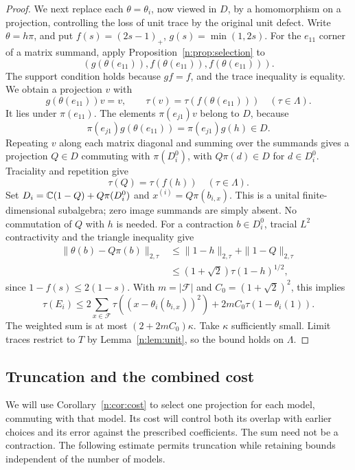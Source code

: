 \begin{proof}
We next replace each $\theta=\theta_i$, now viewed in $D$, by a
homomorphism on a projection, controlling the loss of unit trace by
the original unit defect. Write $\theta=h\pi$, and put
$f(s)=(2s-1)_+$, $g(s)=\min(1,2s)$. For the $e_{11}$ corner of a matrix
summand, apply Proposition~\ref{n:prop:selection} to
\[
 (g(\theta(e_{11})),f(\theta(e_{11})),f(\theta(e_{11}))).
\]
The support condition holds because $gf=f$, and the trace inequality
is equality. We obtain a projection $v$ with
\[
 g(\theta(e_{11}))v=v,\qquad
 \tau(v)=\tau(f(\theta(e_{11})))\quad(\tau\in \Lambda).
\]
It lies under $\pi(e_{11})$. The elements $\pi(e_{j1})v$ belong to $D$,
because
\[
 \pi(e_{j1})g(\theta(e_{11}))=\pi(e_{j1})g(h)\in D.
\]
Repeating $v$ along each matrix diagonal and summing over the summands
gives a projection $Q\in D$ commuting with $\pi(D_i^0)$, with
$Q\pi(d)\in D$ for $d\in D_i^0$. Traciality and repetition give
\[
 \tau(Q)=\tau(f(h))\quad(\tau\in \Lambda).
\]
Set $D_i=\mathbb C(1-Q)+Q\pi(D_i^0)$ and $x^{(i)}=Q\pi(b_{i,x})$.
This is a unital finite-dimensional subalgebra; zero image summands are
simply absent. No commutation of $Q$ with $h$ is needed. For a contraction
$b\in D_i^0$, tracial $L^2$ contractivity and the triangle inequality give
\begin{align*}
 \|\theta(b)-Q\pi(b)\|_{2,\tau}
 &\le\|1-h\|_{2,\tau}+\|1-Q\|_{2,\tau}\\
 &\le(1+\sqrt2)\tau(1-h)^{1/2},
\end{align*}
since $1-f(s)\le2(1-s)$. With $m=|\mathcal F|$ and
$C_0=(1+\sqrt2)^2$, this implies
\[
 \tau(E_i)\le2\sum_{x\in\mathcal F}
       \tau((x-\theta_i(b_{i,x}))^2)+2mC_0\tau(1-\theta_i(1)).
\]
The weighted sum is at most $(2+2mC_0)\kappa$. Take $\kappa$ sufficiently
small. Limit traces restrict to $T$ by Lemma~\ref{n:lem:unit}, so the bound
holds on $\Lambda$.
\end{proof}

\subsection{Truncation and the combined cost}

We will use Corollary~\ref{n:cor:cost} to select one projection for each
model, commuting with that model. Its cost will control both its overlap
with earlier choices and its error against the prescribed coefficients.
The sum need not be a contraction. The following estimate permits truncation
while retaining bounds independent of the number of models.

